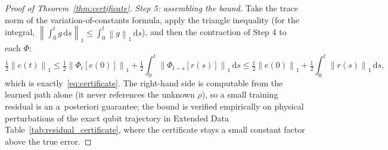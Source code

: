 \documentclass[11pt]{article}
\newcommand{\dd}{\mathrm{d}}
\newcommand{\norm}[1]{\left\lVert #1 \right\rVert}
\begin{document}
\begin{proof}[Proof of Theorem~\ref{thm:certificate}]
\emph{Step 5: assembling the bound.} Take the trace norm of the variation-of-constants formula, apply the triangle inequality (for the integral, $\norm{\int_0^t g\,\dd s}_1\le\int_0^t\norm{g}_1\,\dd s$), and then the contraction of Step 4 to each $\Phi$:
\[
\tfrac12\norm{e(t)}_1\le\tfrac12\norm{\Phi_t[e(0)]}_1+\tfrac12\int_0^t\norm{\Phi_{t-s}[r(s)]}_1\,\dd s\le\tfrac12\norm{e(0)}_1+\tfrac12\int_0^t\norm{r(s)}_1\,\dd s,
\]
which is exactly~\eqref{eq:certificate}. The right-hand side is computable from the learned path alone (it never references the unknown $\rho$), so a small training residual is an a~posteriori guarantee; the bound is verified empirically on physical perturbations of the exact qubit trajectory in Extended Data Table~\ref{tab:residual_certificate}, where the certificate stays a small constant factor above the true error.
\end{proof}
\end{document}
